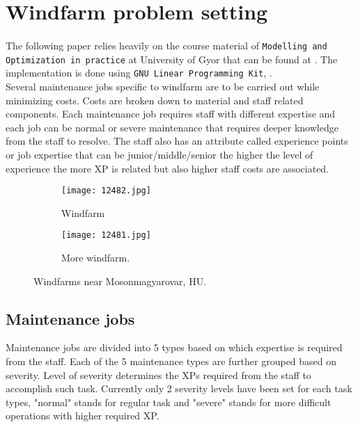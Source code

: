 \section{Windfarm problem setting}
  \paragraph{}
    The following paper relies heavily on the course material of 
    \texttt{Modelling and Optimization in practice} at University of Gyor that can be found at
    \cite{hegyhati}. The implementation is done using \texttt{GNU Linear Programming Kit}, 
    \cite{glpk}. \\
    Several maintenance jobs specific to windfarm are to be carried out while minimizing costs. 
    Costs are broken down to material and staff related components. Each maintenance job 
    requires staff with different expertise and each job can be normal or severe maintenance 
    that requires deeper knowledge from the staff to resolve. The staff also has an attribute 
    called experience points or job expertise that can be junior/middle/senior the higher 
    the level of experience the more XP is related but also higher staff costs are associated.

    \begin{figure}[h!]
      \centering
      \begin{subfigure}[b]{0.4\textwidth}
        \centering
        \texttt{[image: 12482.jpg]}
        \caption{Windfarm}
        \label{fig:Windfarm}
      \end{subfigure}
      \hfill
      \begin{subfigure}[b]{0.4\textwidth}
        \texttt{[image: 12481.jpg]}
        \caption{More windfarm.}
        \label{fig:More windfarm}
      \end{subfigure}
      \caption{Windfarms near Mosonmagyarovar, HU.}
    \end{figure}

    \subsection{Maintenance jobs}
      Maintenance jobs are divided into 5 types based on which expertise is required from the staff. 
      Each of the 5 maintenance types are further grouped based on severity. Level of severity 
      determines the XPs required from the staff to accomplish such task. Currently only 
      2 severity levels have been set for each task types, "normal" stands for regular task 
      and "severe" stands for more difficult operations with higher required XP.

